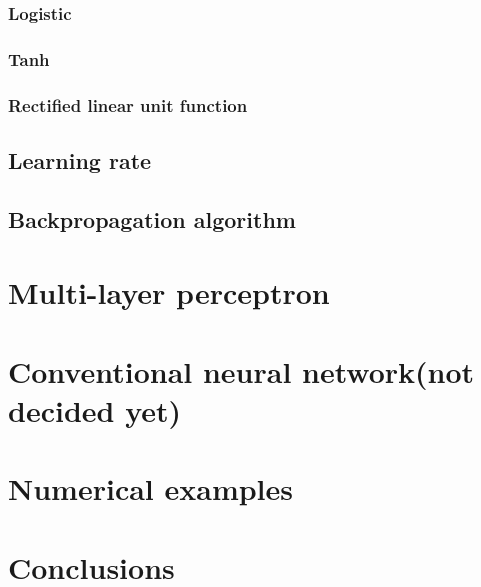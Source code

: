         \subsubsection{Logistic}

        \subsubsection{Tanh}

        \subsubsection{Rectified linear unit function}

    \subsection{Learning rate}

    \subsection{Backpropagation algorithm}

\section{Multi-layer perceptron}

\section{Conventional neural network(not decided yet)}

\section{Numerical examples}

\section{Conclusions}

